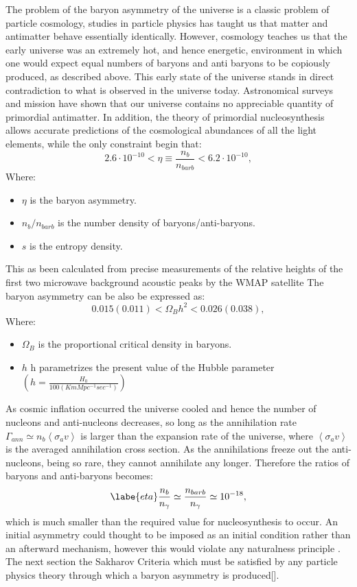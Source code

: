 The problem of the baryon asymmetry of the universe is a classic problem of particle cosmology, studies in particle physics has taught us that matter and antimatter behave essentially identically. However, cosmology teaches us that the early universe was an extremely hot, and hence energetic, environment in which one would expect equal numbers of baryons and anti baryons to be copiously produced, as described above.\cite{13} \cite{5} This early state of the universe stands in direct contradiction to what is observed in the universe today. Astronomical surveys and mission have shown that our universe contains no appreciable quantity of primordial antimatter. In addition, the theory of primordial nucleosynthesis allows accurate predictions of the cosmological abundances of all the light elements, while the only constraint begin that\cite{5}: 
\begin{equation}
2.6\cdot10^{-10} < \eta \equiv \frac{n_{b}}{n_{bar{b}}} < 6.2\cdot10^{-10},
\end{equation}
Where: 
\begin{itemize}
\item $\eta$ is the baryon asymmetry.
\item $n_{b}/ n_{bar{b}}$ is the number density of baryons/anti-baryons.
\item $s$ is the entropy density.
\end{itemize}
This as been calculated from precise measurements of the relative heights of the first two microwave background acoustic peaks by the WMAP satellite \cite{14} The baryon asymmetry can be also be expressed as:
\begin{equation}
0.015(0.011) < \Omega_{B}h^{2} < 0.026(0.038),
\end{equation}
Where: 
\begin{itemize}
\item $\Omega_{B}$ is the proportional critical density in baryons.
\item $h$ h parametrizes the present value of the Hubble parameter $(h = \frac{H_{0}}{100(KmMpc^{-1}sec^{-1})})$
\end{itemize}
As cosmic inflation occurred the universe cooled and hence the number of nucleons and anti-nucleons decreases\cite {1}, so long as the annihilation rate $\Gamma_{ann} \simeq n_{b} \left \langle {\sigma_{a}v} \right \rangle$ is larger than the expansion rate of the universe, where $\left \langle {\sigma_{a}v} \right \rangle$ is the averaged annihilation cross section. As the annihilations freeze out the anti-nucleons, being so rare, they cannot annihilate any longer. Therefore the ratios of baryons and anti-baryons becomes: \cite{1} \cite{14} \cite{11}
\begin{equation} \labe{eta}
\frac{n_{b}}{n_{\gamma}} \simeq \frac{n_{bar{b}}}{n_{\gamma}} \simeq 10^{-18},
\end{equation}
which is much smaller than the required value for nucleosynthesis to occur. An initial asymmetry could thought to be imposed as an initial condition rather than an afterward mechanism, however this would violate any naturalness principle . The next section the Sakharov Criteria which must be satisfied by any particle physics theory through which a baryon asymmetry is produced[\cite{5}\cite{13}].

